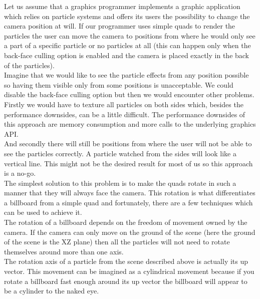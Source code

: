 Let us assume that a graphics programmer implements a graphic application which relies on particle systems and offers its users the possibility to change the camera position at will. If our programmer uses simple quads to render the particles the user can move the camera to positions from where he would only see a part of a specific particle or no particles at all (this can happen only when the back-face culling option is enabled and the camera is placed exactly in the back of the particles).\\

Imagine that we would like to see the particle effects from any position possible so having them visible only from some positions is unacceptable. We could disable the back-face culling option but then we would encounter other problems.\\

Firstly we would have to texture all particles on both sides which, besides the performance downsides, can be a little difficult. The performance downsides of this approach are memory consumption and more calls to the underlying graphics API.\\

And secondly there will still be positions from where the user will not be able to see the particles correctly. A particle watched from the sides will look like a vertical line. This might not be the desired result for most of us so this approach is a no-go.\\

The simplest solution to this problem is to make the quads rotate in such a manner that they will always face the camera. This rotation is what differentiates a billboard from a simple quad and fortunately, there are a few techniques which can be used to achieve it.\\

\newpage
The rotation of a billboard depends on the freedom of movement owned by the camera. If the camera can only move on the ground of the scene (here the ground of the scene is the XZ plane) then all the particles will not need to rotate themselves around more than one axis.\\

The rotation axis of a particle from the scene described above is actually its up vector. This movement can be imagined as a cylindrical movement because if you rotate a billboard fast enough around its up vector the billboard will appear to be a cylinder to the naked eye.\\

